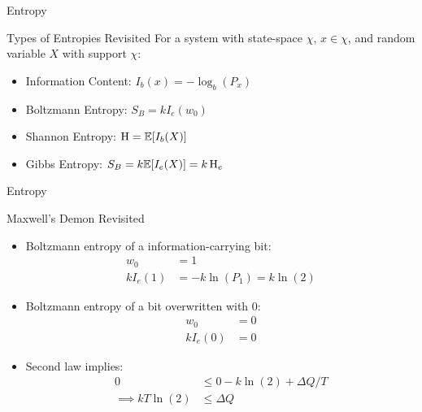 \begin{frame}{Entropy}
\begin{block}{Types of Entropies Revisited}
For a system with state-space $\chi$, $x\in\chi$, and random variable $X$ with support $\chi$:
\begin{itemize}
	\item Information Content: $I_b(x) = - \log_b(P_x)$
	\item Boltzmann Entropy: $S_B = kI_e(w_0)$
	\item Shannon Entropy: $\operatorname{H} = \mathbb{E}[I_b(X)]$
	\item Gibbs Entropy: $S_B = k\mathbb{E}[I_e(X)] = k\operatorname{H}_e$ 
\end{itemize}
\end{block}
\end{frame}


\begin{frame}{Entropy}
\begin{block}{Maxwell's Demon Revisited}
\begin{itemize}
	\item Boltzmann entropy of a information-carrying bit:
	{\small
	\begin{align*}
		w_0 &= 1\\
		kI_e(1) &= -k\ln(P_1) = k\ln(2)
	\end{align*}}
	\item Boltzmann entropy of a bit overwritten with 0:
	{\small
	\begin{align*}
		w_0 &= 0\\
		kI_e(0) &= 0
	\end{align*}}
	\item Second law implies:
	{\small
	\begin{align*}
		0 &\le 0 - k\ln(2) + \Delta Q/T\\
		\implies kT\ln(2) &\le \Delta Q
	\end{align*}
	}
\end{itemize}
\end{block}
\end{frame}



















